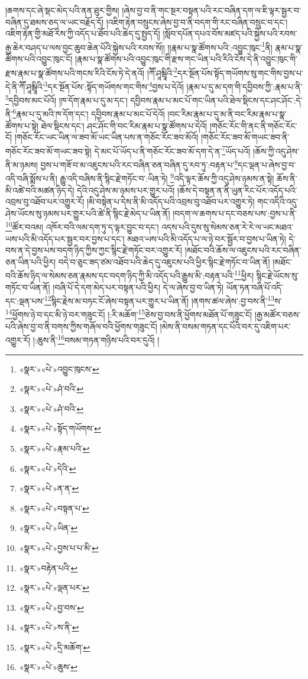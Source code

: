 །ཆགས་དང་ཞེ་སྡང་མེད་པའི་ནན་ཐུར་གྱིས། །ཞེས་བྱ་བ་ནི་གང་སྔར་བསྟན་པའི་རང་བཞིན་དག་ལ་ཇི་ལྟར་སྦྱར་བ་བཞིན་དུ་ཐམས་ཅད་ལ་ཡང་བརྗོད་དོ། །འཇིག་རྟེན་བསྲུངས་ཞེས་བྱ་བ་ནི་བདག་གི་རང་བཞིན་བསྲུང་བ་དང་། འཇིག་རྟེན་གྱི་མཐོ་རིས་ཀྱི་འདོད་པ་ཐོབ་པའི་ཆེད་དུ་སྤྱད་དོ། །སློབ་དཔོན་དཔའ་བོས་མཛད་པའི་སྐྱེས་པའི་རབས་རྒྱ་ཆེར་བཤད་པ་ལས་བྱང་ཆུབ་ཆེན་པོའི་སྐྱེས་པའི་རབས་སོ།། །།རྣམ་པ་སྣ་ཚོགས་པའི་:འབྱུང་ཁུང་\footnote{«སྣར་»«པེ་»འབྱུང་ཁུངས་}ནི། རྣམ་པ་སྣ་ཚོགས་པའི་འབྱུང་ཁུང་ངོ། །རྣམ་པ་སྣ་ཚོགས་པའི་འབྱུང་ཁུང་གི་རྫས་གང་ཡིན་པའི་རིའི་ངོས་དེ་ནི་འབྱུང་ཁུང་གི་རྫས་རྣམ་པ་སྣ་ཚོགས་པའི་གངས་རིའི་ངོས་ཏེ་དེ་ནའོ། །ཀཽ་ཤཱམྦཱིའི་\footnote{«སྣར་»«པེ་»ཤཾ་བའི་}དར་སྔོན་པོས་སྟོད་གཡོགས་སུ་གང་གིས་བྱས་པ་དེ་ནི་ཀཽ་ཤཱམྦཱིའི་\footnote{«སྣར་»«པེ་»ཤཾ་བའི་}དར་སྔོན་པོས་:སྟོད་གཡོགས་གང་གིས་\footnote{«སྣར་»«པེ་»སྟོད་གཡོགས་}བྱས་པ་དེའོ། །རྣམ་པ་དུ་མ་དག་གི་དབྱིབས་ཀྱི་:རྣམ་པ་ནི་\footnote{«སྣར་»«པེ་»རྣམ་པའི་}དབྱིབས་མང་པོའོ། །ཁ་དོག་རྣམ་པ་དུ་མ་དང་། དབྱིབས་རྣམ་པ་མང་པོ་གང་ཡིན་པའི་ཐེལ་སྡིངས་དང་ཤང་ཤོང་:དེ་ནི་\footnote{«སྣར་»«པེ་»དེའི་}རྣམ་པ་དུ་མའི་ཁ་དོག་དང་། དབྱིབས་རྣམ་པ་མང་པོ་དེའོ། །བང་རིམ་རྣམ་པ་དུ་མ་ནི་བང་རིམ་རྣམ་པ་སྣ་ཚོགས་པ་སྟེ། ཐེལ་སྡིངས་དང་། ཤང་ཤོང་གི་བང་རིམ་རྣམ་པ་སྣ་ཚོགས་པ་དེའོ། །གཅོང་རོང་གི་ནང་ནི་གཅོང་རོང་ངོ། །གཅོང་རོང་ཡང་ཡིན་ལ་ཟབ་མོ་ཡང་ཡིན་པས་ན་གཅོང་རོང་ཟབ་མོའོ། །གཅོང་རོང་ཟབ་མོ་གཡང་ཟབ་ནི་གཅོང་རོང་ཟབ་མོ་གཡང་ཟབ་སྟེ། དེ་མང་པོ་ཡོད་པ་ནི་གཅོང་རོང་ཟབ་མོ་དག་དེ་ན་\footnote{«སྣར་»«པེ་»ན་ན་}ཡོད་པའོ། །ཆོས་ཀྱི་འདུ་ཤེས་ནི་མ་ཉམས། བྱས་པ་གཟོ་བ་མ་འཇུངས་པའི་རང་བཞིན་ཅན་བཞིན་དུ་རབ་ཏུ་:བརྟན་པ་\footnote{«སྣར་»«པེ་»བསྟན་པ་}དང་ལྡན་པ་ཞེས་བྱ་བ་འདི་བཞི་སྨོས་པ་ནི། རྒྱུ་འདི་བཞིས་ནི་སྙིང་རྗེ་གཏོང་བ་:ཡིན་ཏེ། \footnote{«སྣར་»«པེ་»ཡིན་}འདི་ལྟར་ཆོས་ཀྱི་འདུ་ཤེས་ཉམས་ན་སྟེ། ཆོས་ནི་མི་འཚེ་བའི་མཚན་ཉིད་དེ། དེའི་འདུ་ཤེས་མ་ཉམས་པར་གྱུར་པའོ། །ཆོས་དེ་བསྟན་ན་ནི་ཡུན་རིང་པོར་འདོད་པའི་འབྲས་བུ་འཐོབ་པར་འགྱུར་རོ། །མི་བསྟེན་པ་དེས་ནི་མི་འདོད་པའི་འབྲས་བུ་འཐོབ་པར་འགྱུར་ཏེ། གང་འདིའི་འདུ་ཤེས་ཡོངས་སུ་ཉམས་པར་གྱུར་པའི་ཚེ་ནི་སྙིང་རྗེ་མེད་པ་ཡིན་ནོ། །བདག་ལ་ཆགས་པ་དང་བཅས་པས་:བྱས་པ་ནི་\footnote{«སྣར་»«པེ་»བྱས་པ་པ་མི་}ཚོར་བའམ། འཁོར་བའི་ལམ་དག་ཏུ་ད་ལྟར་བྱུང་བ་དང་། འདས་པའི་དུས་སུ་སེམས་ཅན་རེ་རེ་ལ་ཡང་མཐའ་ཡས་པའི་མི་འདོད་པར་སྦྱར་བར་བྱས་པ་དང་། མཐའ་ཡས་པའི་མི་འདོད་པ་ལ་ཉེ་བར་སྦྱོར་བ་བྱས་པ་ཡིན་ཏེ། དེ་བས་ན་དེ་བྱས་པས་བདག་ཉིད་ཀྱིས་ཀྱང་སྙིང་རྗེ་གཏོང་བར་འགྱུར་རོ། །མཐོང་བའི་ཆོས་ལ་འཇུངས་པའི་རང་བཞིན་ཅན་ཡིན་པའི་ཕྱིར། བདེ་བ་ཅུང་ཟད་ཙམ་འཐོབ་པའི་ཆེད་དུ་འཇུངས་པའི་ཕྱིར་སྙིང་རྗེ་གཏོང་བ་ཡིན་ནོ། །མཐོང་བའི་ཆོས་ཉིད་ལ་སེམས་ཅན་རྣམས་དང་བདག་ཉིད་ཀྱི་མི་འདོད་པའི་རྒྱུས་མི་:བརྟན་པའི་\footnote{«སྣར་»བརྟེན་པའི་}ཕྱིར། སྙིང་རྗེ་ཡོངས་སུ་གཏོང་བ་ཡིན་ནོ། །བཞི་པོ་དེ་དག་མེད་པར་བསྟན་པའི་ཕྱིར། དེ་ལ་ཞེས་བྱ་བ་ཡིན་ཏེ། ཡོན་ཏན་བཞི་པོ་འདི་དང་:ལྡན་པས་\footnote{«སྣར་»«པེ་»ལྡན་པར་}སྙིང་རྗེས་མ་བཏང་ངོ་ཞེས་བསྟན་པར་གྱུར་པ་ཡིན་ནོ། །ནགས་ཚལ་ཞེས་:བྱ་བས་ནི་\footnote{«སྣར་»«པེ་»བྱ་བས་}ས་\footnote{«སྣར་»«པེ་»ས་ནི་}ཕྱོགས་ཉེ་བ་དང་མི་ཉེ་བར་གཟུང་ངོ། །:རི་མཆོག་\footnote{«སྣར་»«པེ་»དྲི་མཆོག་}ཅེས་བྱ་བས་ནི་ཕྱོགས་མཐོན་པོ་གཟུང་ངོ། །རྒྱ་མཚོར་བཅས་པའི་ཞེས་བྱ་བ་ནི་བགས་ཀྱིས་གཞོལ་བའི་ཕྱོགས་གཟུང་ངོ། །མེས་ནི་བསམ་གཏན་དང་པོའི་བར་དུ་འཇིག་པར་འགྱུར་རོ། །:ཆུས་ནི་\footnote{«སྣར་»«པེ་»ཆུས་}བསམ་གཏན་གཉིས་པའི་བར་དུའོ། །
